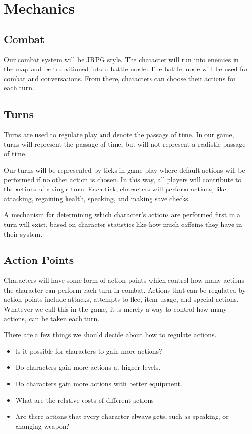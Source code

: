 \documentclass[14pt]{article}
\author{Tessa Saul}
\begin{document}
\section*{Mechanics}

\subsection*{Combat}
Our combat system will be JRPG style. 
The character will run into enemies in the map and be transitioned
 into a battle mode. The battle mode will be used for combat and 
 conversations. From there, characters can choose their actions for each 
 turn. 

\subsection*{Turns}

Turns are used to regulate play and denote the passage of time. 
In our game, turns will represent the passage of time, but will 
not represent a realistic passage of time. 

Our turns will be represented by ticks in game play where default
actions will be performed if no other action is chosen. 
In this way, all players will contribute to the actions of a single 
turn. Each tick, characters will perform actions, like attacking,
regaining health, speaking, and making save checks. 

A mechanism for determining which character's actions are performed
first in a turn will exist, based on character statistics like how much
caffeine they have in their system. 

\subsection*{Action Points}

Characters will have some form of action points which control how 
many actions the character can perform each turn in combat. Actions
that can be regulated by action points include attacks, attempts to 
flee, item usage, and special actions. 
Whatever we call this in the game, it is merely a way to control
how many actions, can be taken each turn. 

There are a few things we should decide about how to regulate actions.
\begin{itemize}
\item Is it possible for characters to gain more actions?
\item Do characters gain more actions at higher levels. 
\item Do characters gain more actions with better equipment.
\item What are the relative costs of different actions 
\item Are there actions that every character always gets, such as speaking, or changing weapon? 
\end{itemize}
\end{document}
